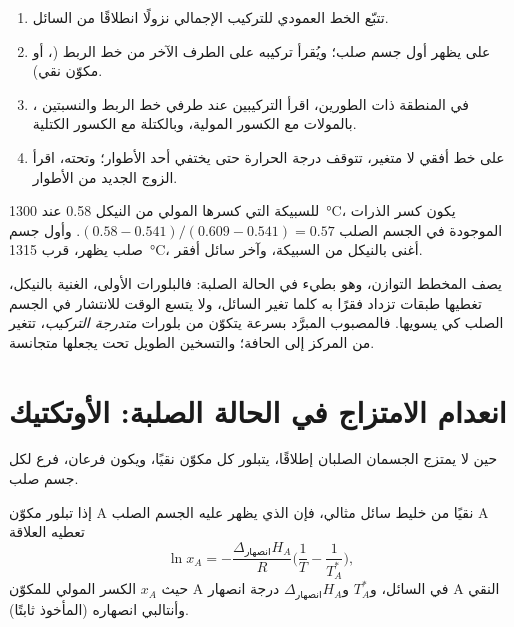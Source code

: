 \begin{method}\label{met:b2:solid-liquid-diagrams:read-solid-liquid}
\begin{enumerate}
  \item تتبّع الخط العمودي للتركيب الإجمالي نزولًا انطلاقًا من
        السائل.
  \item على  يظهر أول جسم صلب؛ ويُقرأ تركيبه على
        الطرف الآخر من خط الربط (، أو مكوّن نقي).
  \item في المنطقة ذات الطورين، اقرأ التركيبين عند طرفي خط
        الربط والنسبتين ، بالمولات مع الكسور
        المولية، وبالكتلة مع الكسور الكتلية.
  \item على خط أفقي لا متغير، تتوقف درجة الحرارة حتى يختفي
        أحد الأطوار؛ وتحته، اقرأ الزوج الجديد من الأطوار.
\end{enumerate}
\end{method}

\begin{example}\label{ex:b2:solid-liquid-diagrams:lever}
للسبيكة التي كسرها المولي من النيكل 0.58 عند \qty{1300}{\degreeCelsius}، يكون
كسر الذرات الموجودة في الجسم الصلب $(0.58 - 0.541)/(0.609 - 0.541) = 0.57$.
وأول جسم صلب يظهر، قرب \qty{1315}{\degreeCelsius}، أغنى بالنيكل
من السبيكة، وآخر سائل أفقر.
\end{example}

يصف المخطط التوازن، وهو بطيء في الحالة الصلبة: فالبلورات الأولى،
الغنية بالنيكل، تغطيها طبقات تزداد فقرًا به كلما
تغير السائل، ولا يتسع الوقت للانتشار في الجسم الصلب كي يسويها. فالمصبوب
المبرَّد بسرعة يتكوّن من بلورات \textit{متدرجة التركيب}، تتغير من المركز إلى
الحافة؛ والتسخين الطويل تحت  يجعلها متجانسة.

\section{انعدام الامتزاج في الحالة الصلبة: الأوتكتيك}

حين لا يمتزج الجسمان الصلبان إطلاقًا، يتبلور كل مكوّن نقيًا، ويكون
 فرعان، فرع لكل جسم صلب.

\begin{theorem}\label{thm:b2:solid-liquid-diagrams:schroder}
إذا تبلور مكوّن A نقيًا من خليط سائل مثالي، فإن 
الذي يظهر عليه الجسم الصلب A تعطيه العلاقة
\[
  \ln x_A = -\frac{\Delta_{\text{انصهار}}H_A}{R}\Big(\frac1T - \frac1{T_A^*}\Big),
\]
حيث $x_A$ الكسر المولي للمكوّن A في السائل، و$T_A^*$ 
و$\Delta_{\text{انصهار}}H_A$ درجة انصهار A النقي وأنتالبي انصهاره
(المأخوذ ثابتًا).
\end{theorem}

